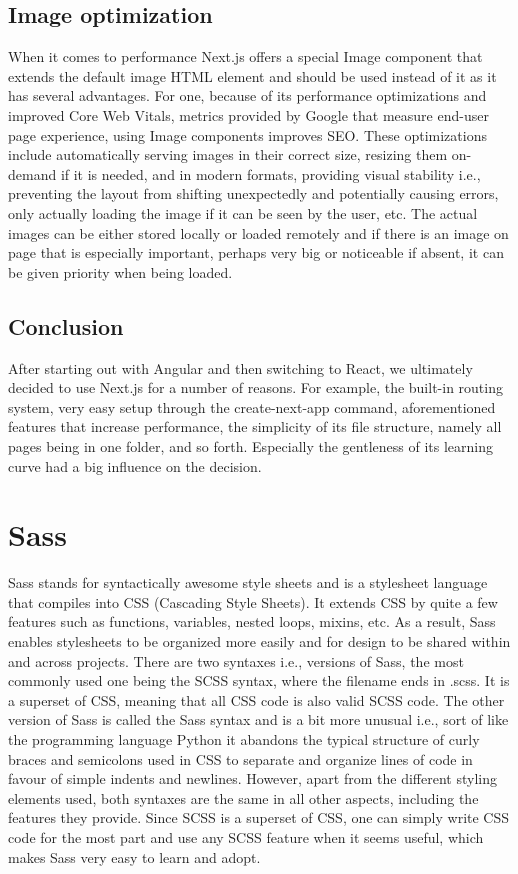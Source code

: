 \subsection{Image optimization}
When it comes to performance Next.js offers a special Image component that extends the default image HTML element and should be used instead of
it as it has several advantages. For one, because of its performance optimizations and improved Core Web Vitals, metrics provided by Google that
measure end-user page experience, using Image components improves SEO. These optimizations include automatically serving images in their correct
size, resizing them on-demand if it is needed, and in modern formats, providing visual stability i.e., preventing the layout from shifting unexpectedly
and potentially causing errors, only actually loading the image if it can be seen by the user, etc. The actual images can be either stored locally
or loaded remotely and if there is an image on page that is especially important, perhaps very big or noticeable if absent, it can be given priority
when being loaded. \cite{NextjsImageOptimization}

\subsection{Conclusion}
After starting out with Angular and then switching to React, we ultimately decided to use Next.js for a number of reasons. For example, the built-in
routing system, very easy setup through the create-next-app command, aforementioned features that increase performance, the simplicity of its
file structure, namely all pages being in one folder, and so forth. Especially the gentleness of its learning curve had a big influence on the decision.

\section{Sass}
Sass stands for syntactically awesome style sheets and is a stylesheet language that compiles into CSS (Cascading Style Sheets). It extends CSS by quite
a few features such as functions, variables, nested loops, mixins, etc. As a result, Sass enables stylesheets to be organized more easily and for design
to be shared within and across projects. There are two syntaxes i.e., versions of Sass, the most commonly used one being the SCSS syntax, where the
filename ends in .scss. It is a superset of CSS, meaning that all CSS code is also valid SCSS code. The other version of Sass is called the Sass syntax
and is a bit more unusual i.e., sort of like the programming language Python it abandons the typical structure of curly braces and semicolons used in CSS
to separate and organize lines of code in favour of simple indents and newlines. However, apart from the different styling elements used, both syntaxes
are the same in all other aspects, including the features they provide. Since SCSS is a superset of CSS, one can simply write CSS code for the most part
and use any SCSS feature when it seems useful, which makes Sass very easy to learn and adopt. \cite{SassFeatures}

